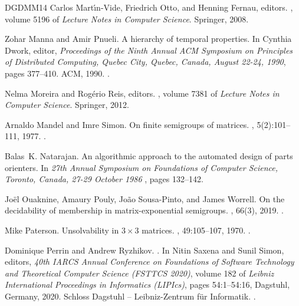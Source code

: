 \documentclass[11pt,a4paper]{amsart}
\theoremstyle{plain}
\theoremstyle{definition}
\theoremstyle{defC}
\theoremstyle{thmC}
\theoremstyle{plain}
\numberwithin{equation}{section}
\begin{document}
\begin{thebibliography}{DGDMM14}
Carlos Mart{\'{\i}}n{-}Vide, Friedrich Otto, and Henning Fernau, editors.
, volume 5196 of {\em Lecture Notes in Computer Science}.
  Springer, 2008.

Zohar Manna and Amir Pnueli.
\newblock A hierarchy of temporal properties.
\newblock In Cynthia Dwork, editor, {\em Proceedings of the Ninth Annual {ACM}
  Symposium on Principles of Distributed Computing, Quebec City, Quebec,
  Canada, August 22-24, 1990}, pages 377--410. {ACM}, 1990.
\newblock \href {https://doi.org/10.1145/93385.93442}
  {}.

Nelma Moreira and Rog{\'{e}}rio Reis, editors.
,
  volume 7381 of {\em Lecture Notes in Computer Science}. Springer, 2012.

Arnaldo Mandel and Imre Simon.
\newblock On finite semigroups of matrices.
, 5(2):101--111, 1977.
\newblock \href {https://doi.org/10.1016/0304-3975(77)90001-9}
  {}.

Balas~K. Natarajan.
\newblock An algorithmic approach to the automated design of parts orienters.
\newblock In {\em 27th Annual Symposium on Foundations of Computer Science,
  Toronto, Canada, 27-29 October 1986\/} \cite{DBLP:conf/focs/FOCS27}, pages
  132--142.

Jo\"{e}l Ouaknine, Amaury Pouly, Jo\~{a}o Sousa-Pinto, and James Worrell.
\newblock On the decidability of membership in matrix-exponential semigroups.
, 66(3), 2019.
\newblock \href {https://doi.org/10.1145/3286487} {}.

Mike Paterson.
\newblock Unsolvability in $3 \times 3$ matrices.
, 49:105--107, 1970.
\newblock \href {https://doi.org/10.1002/sapm1970491105}
  {}.

Dominique Perrin and Andrew Ryzhikov.
.
\newblock In Nitin Saxena and Sunil Simon, editors, {\em 40th IARCS Annual
  Conference on Foundations of Software Technology and Theoretical Computer
  Science (FSTTCS 2020)}, volume 182 of {\em Leibniz International Proceedings
  in Informatics (LIPIcs)}, pages 54:1--54:16, Dagstuhl, Germany, 2020. Schloss
  Dagstuhl -- Leibniz-Zentrum f{\"u}r Informatik.
\newblock \href {https://doi.org/10.4230/LIPIcs.FSTTCS.2020.54}
  {}.


\end{thebibliography}
\end{document}
